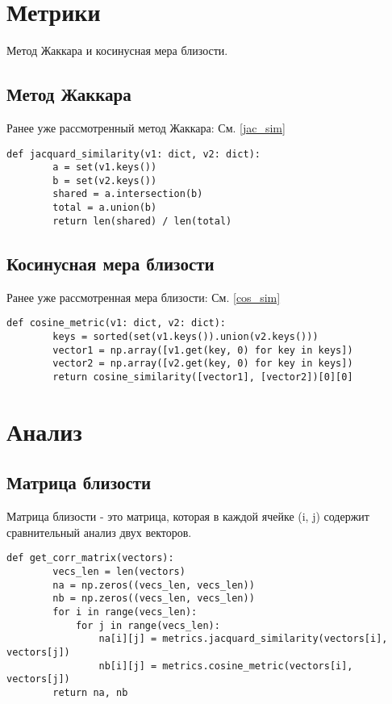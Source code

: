 \section{Метрики}

Метод Жаккара и косинусная мера близости.

\subsection{Метод Жаккара}

Ранее уже рассмотренный метод Жаккара: См. \ref{jac_sim}

\begin{lstlisting}[label=jac-func, caption={Метод Жаккара}]
    def jacquard_similarity(v1: dict, v2: dict):
        a = set(v1.keys())
        b = set(v2.keys())
        shared = a.intersection(b)
        total = a.union(b)
        return len(shared) / len(total)
\end{lstlisting}

\subsection{Косинусная мера близости}

Ранее уже рассмотренная мера близости: См. \ref{cos_sim}

\begin{lstlisting}[label=cos-func, caption={Косинусная мера близости}]
    def cosine_metric(v1: dict, v2: dict):
        keys = sorted(set(v1.keys()).union(v2.keys()))
        vector1 = np.array([v1.get(key, 0) for key in keys])
        vector2 = np.array([v2.get(key, 0) for key in keys])
        return cosine_similarity([vector1], [vector2])[0][0]
\end{lstlisting}

\section{Анализ}

\subsection{Матрица близости}

Матрица близости - это матрица, которая в каждой ячейке (i, j) содержит сравнительный анализ двух векторов.

\begin{lstlisting}[label=cor_matr, caption={Получение матрицы близости}]
    def get_corr_matrix(vectors):
        vecs_len = len(vectors)
        na = np.zeros((vecs_len, vecs_len))
        nb = np.zeros((vecs_len, vecs_len))
        for i in range(vecs_len):
            for j in range(vecs_len):
                na[i][j] = metrics.jacquard_similarity(vectors[i], vectors[j])
                nb[i][j] = metrics.cosine_metric(vectors[i], vectors[j])
        return na, nb
\end{lstlisting}

